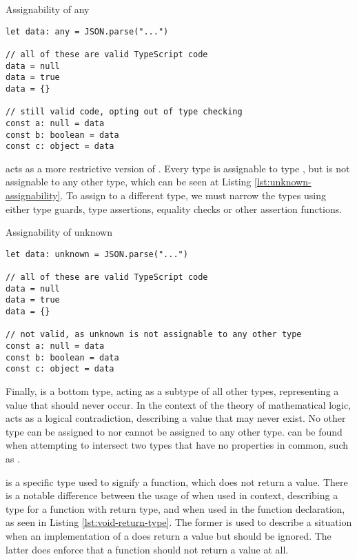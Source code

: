 \begin{listing}[h]
  \caption{Assignability of any}\label{lst:any-assignability}
  \begin{verbatim}
let data: any = JSON.parse("...") 

// all of these are valid TypeScript code
data = null
data = true
data = {}

// still valid code, opting out of type checking
const a: null = data
const b: boolean = data
const c: object = data
  \end{verbatim}
\end{listing}

 acts as a more restrictive version of . Every type is assignable to type , but  is not assignable to any other type, which can be seen at Listing \ref{lst:unknown-assignability}. To assign  to a different type, we must narrow the types using either type guards, type assertions, equality checks or other assertion functions.

\begin{listing}[h]
  \caption{Assignability of unknown}\label{lst:unknown-assignability}
  \begin{verbatim}
let data: unknown = JSON.parse("...") 

// all of these are valid TypeScript code
data = null
data = true
data = {}

// not valid, as unknown is not assignable to any other type
const a: null = data
const b: boolean = data
const c: object = data
  \end{verbatim}
\end{listing}

Finally,  is a bottom type, acting as a subtype of all other types, representing a value that should never occur. In the context of the theory of mathematical logic,  acts as a logical contradiction, describing a value that may never exist. No other type can be assigned to  nor  cannot be assigned to any other type.  can be found when attempting to intersect two types that have no properties in common, such as .

 is a specific type used to signify a function, which does not return a value. There is a notable difference between the usage of  when used in context, describing a type for a function with  return type, and when used in the function declaration, as seen in Listing \ref{lst:void-return-type}. The former is used to describe a situation when an implementation of a  does return a value but should be ignored. The latter does enforce that a function should not return a value at all.

